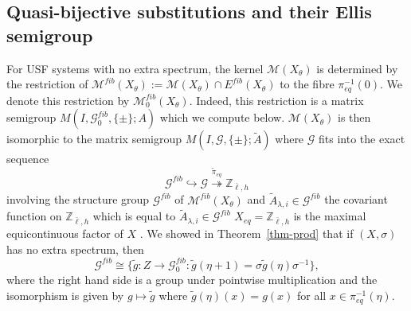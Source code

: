 \documentclass[10pt,a4paper]{amsart}
\numberwithin{equation}{section}
\newcommand{\Z}{\mathbb Z}
\newcommand{\Gg}{{\mathcal G}}
\newcommand{\Mm}{{\mathcal M}}
\newcommand{\Xe}{X_{eq}}
\newcommand{\pe}{\pi_{eq}}
\newcommand{\M}{\mathcal M}
\newcommand{\Ef}{E^{fib}}
\begin{document}
\subsection{Quasi-bijective substitutions and their Ellis semigroup}\label{bijective}








For USF systems with no extra spectrum, the kernel $\M(X_\theta)$ is determined by the restriction of $\Mm^{fib}(X_\theta):=\Mm(X_\theta)\cap \Ef(X_\theta)$ to the fibre $\pe^{-1}(0)$. We denote this restriction by $\Mm^{fib}_0(X_\theta)$. Indeed, this restriction is a matrix semigroup $M(I,\Gg_0^{fib},\{\pm\};A)$ which we compute below.  $\M(X_\theta)$  is then  isomorphic to the matrix semigroup $M(I,\Gg,\{\pm\};\tilde A)$ where $\Gg$ fits into the exact sequence
\begin{equation*}%
\Gg^{fib} \hookrightarrow  \Gg \stackrel{\widetilde\pe} \twoheadrightarrow 
\Z_{\bar{\ell},h}
\end{equation*}
involving the structure group $\Gg^{fib}$ of $\Mm^{fib}(X_\theta)$ and 
$\tilde A_{\lambda,i} \in\Gg^{fib}$ the covariant function on $\Z_{\bar{\ell},h}$ which is equal to $\tilde A_{\lambda,i} \in\Gg^{fib}$
$\Xe=\Z_{\bar{\ell},h}$ is the maximal equicontinuous factor of $X$ \cite{ESBS}. 
 We showed in Theorem~\ref{thm-prod} that if $(X,\sigma)$ has no extra spectrum, then  
$$\Gg^{fib} \cong \{\tilde g:Z\to \Gg_0^{fib}:\tilde g(\eta+1) = \sigma \tilde g(\eta) \sigma^{-1}\},$$
where the right hand side is a group under pointwise multiplication and the isomorphism is given by $g\mapsto \tilde g$ where $\tilde g(\eta)(x) = g(x)$ for all $x\in \pe^{-1}(\eta)$. 

%
\end{document}
